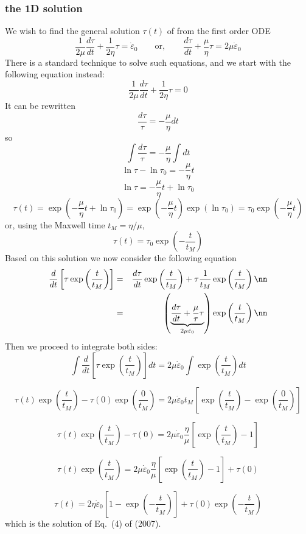 \subsubsection{the 1D solution}
We wish to find the general solution $\tau(t)$ of from the first order ODE
\[
\frac{1}{2\mu} \frac{d\tau}{dt} + \frac{1}{2\eta} \tau = \dot\varepsilon_0
\qquad
\text{or},
\qquad
\frac{d\tau}{dt} + \frac{\mu}{\eta} \tau = 2\mu \dot\varepsilon_0
\]
There is a standard technique to solve such equations, and we start with the following equation instead:
\[
\frac{1}{2\mu} \frac{d\tau}{dt} + \frac{1}{2\eta} \tau = 0
\]
It can be rewritten
\[
\frac{d\tau}{\tau} = -\frac{\mu}{\eta} dt
\]
so
\[
\int \frac{d\tau}{\tau} = -\frac{\mu}{\eta} \int dt
\]
\[
\ln \tau - \ln \tau_0 = -\frac{\mu}{\eta} t 
\]
\[
\ln \tau = -\frac{\mu}{\eta} t  + \ln \tau_0
\]
\[
\tau(t) 
= \exp \left(  -\frac{\mu}{\eta} t  + \ln \tau_0 \right) 
= \exp \left(  -\frac{\mu}{\eta} t   \right)   \exp \left(  \ln \tau_0 \right) 
= \tau_0 \exp \left(  -\frac{\mu}{\eta} t   \right) 
\]
or, using the Maxwell time $t_M=\eta/\mu$,
\[
\tau(t) 
= \tau_0 \exp \left(  -\frac{t}{t_M}   \right) 
\]
Based on this solution we now 
consider the following equation
\begin{eqnarray}
\frac{d}{dt} \left[   \tau \exp\left( \frac{t}{t_M}   \right)  \right]
&=& 
\frac{d \tau}{dt}  \exp\left( \frac{t}{t_M}   \right)  +
\tau \frac{1}{t_M} \exp\left( \frac{t}{t_M}   \right)  \nn\\
&=& 
\left( \underbrace{\frac{d \tau}{dt} + \frac{\mu}{\tau} \tau}_{2\mu \dot\varepsilon_0}  \right)  \exp\left( \frac{t}{t_M}   \right)  \nn
\end{eqnarray}
Then we proceed to integrate both sides:
\[
\int \frac{d}{dt} \left[   \tau \exp\left( \frac{t}{t_M}   \right)  \right] dt
= 2\mu \dot\varepsilon_0 \int \exp\left( \frac{t}{t_M}   \right)  dt
\]

\[
\tau(t) \exp\left( \frac{t}{t_M}   \right)
-
\tau(0) \exp\left( \frac{0}{t_M}   \right)
 =
 2\mu \dot\varepsilon_0  t_M  [ \exp\left( \frac{t}{t_M}   \right)  -  \exp\left( \frac{0}{t_M} \right) ]
\]

\[
\tau(t) \exp\left( \frac{t}{t_M}   \right)
- \tau(0) 
=
2 \mu  \dot\varepsilon_0 \frac{\eta}{\mu} [ \exp\left( \frac{t}{t_M}   \right) -1 ]
\]

\[
\tau(t) \exp\left( \frac{t}{t_M} \right)
=
2 \mu  \dot\varepsilon_0 \frac{\eta}{\mu} [ \exp\left( \frac{t}{t_M}   \right) -1 ] + \tau(0) 
\]

\[
\tau(t) 
=
2 \eta  \dot\varepsilon_0  [1- \exp\left( -\frac{t}{t_M}\right) ] + \tau(0) \exp\left( -\frac{t}{t_M} \right)
\]
which is the solution of Eq.~(4) of \textcite{kabe07} (2007).

